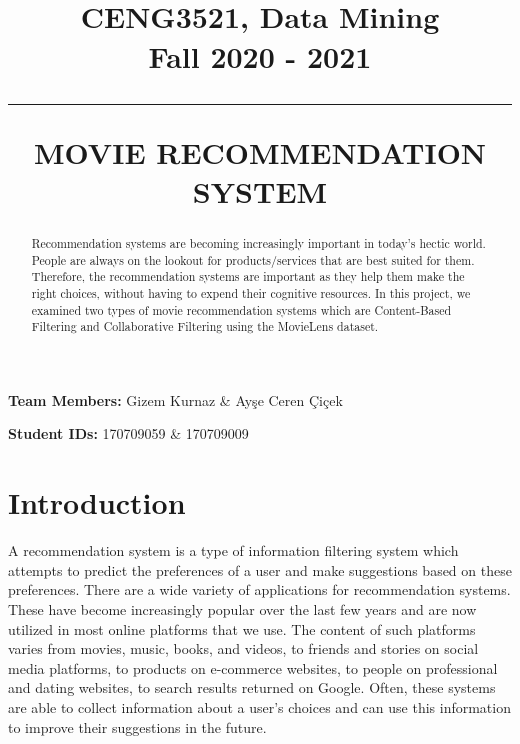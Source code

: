 \documentclass[onecolumn]{article}
\title{\vspace{-3.5cm}\spacecaps{FINAL PROJECT}\\ \normalsize {CENG3521, Data Mining} \\ \normalsize {Fall 2020 - 2021} \\\rule{140mm}{0.3mm}}
\author{}
\date{\vspace{-2cm}}
\begin{document}
\maketitle
\vspace{5mm}
\hspace{-0.1cm}\textbf{Team Members:} Gizem Kurnaz \& Ay\c{s}e Ceren \c{C}i\c{c}ek

\vspace{2mm}
\hspace{-0.1cm}\textbf{Student IDs:} 170709059 \& 170709009


\begin{center}
\hfill \break
\hfill \break
\hfill \break
\title{{\vspace{+0.5cm}\Large \textbf{MOVIE RECOMMENDATION SYSTEM}}}
\end{center}


\begin{abstract}
Recommendation systems are becoming increasingly important in today’s hectic world. People are always on the lookout for products/services that are best suited for them. Therefore, the recommendation systems are important as they help them make the right choices, without having to expend their cognitive resources. In this project, we examined two types of movie recommendation systems which are Content-Based Filtering and Collaborative Filtering using the MovieLens dataset.
\end{abstract}

\section{\textbf{Introduction}}
\vspace{2mm}

\hspace{0.5cm}A recommendation system is a type of information filtering system which attempts to predict the preferences of a user and make suggestions based on these preferences. There are a wide variety of applications for recommendation systems. These have become increasingly popular over the last few years and are now utilized in most online platforms that we use. The content of such platforms varies from movies, music, books, and videos, to friends and stories on social media platforms, to products on e-commerce websites, to people on professional and dating websites, to search results returned on Google. Often, these systems are able to collect information about a user's choices and can use this information to improve their suggestions in the future. 
\vspace{4mm}
\end{document}
